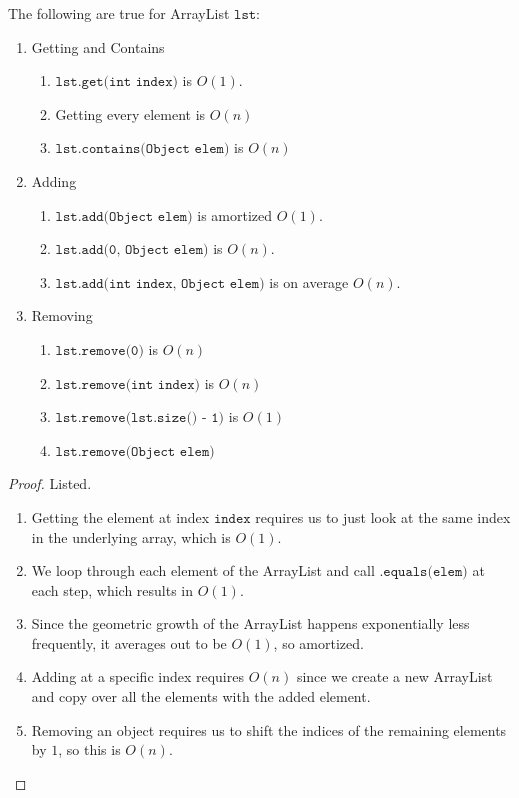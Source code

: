 \documentclass{article}
\begin{document}
    \begin{theorem}
    The following are true for ArrayList $\texttt{lst}$:  
    \begin{enumerate}
        \item Getting and Contains 
        \begin{enumerate}
            \item $\texttt{lst.get(int index)}$ is $O(1)$. 
            \item Getting every element is $O(n)$ 
            \item $\texttt{lst.contains(Object elem)}$ is $O(n)$
        \end{enumerate}
        
        \item Adding 
        \begin{enumerate}
            \item $\texttt{lst.add(Object elem)}$ is amortized $O(1)$. 
            \item $\texttt{lst.add(0, Object elem)}$ is $O(n)$. 
            \item $\texttt{lst.add(int index, Object elem)}$ is on average $O(n)$. 
        \end{enumerate}
        
        \item Removing 
        \begin{enumerate}
            \item $\texttt{lst.remove(0)}$ is $O(n)$ 
            \item $\texttt{lst.remove(int index)}$ is $O(n)$ 
            \item $\texttt{lst.remove(lst.size() - 1)}$ is $O(1)$ 
            \item $\texttt{lst.remove(Object elem)}$ 
        \end{enumerate}
    \end{enumerate}
    \end{theorem}
    \begin{proof}
    Listed. 
    \begin{enumerate}
        \item Getting the element at index $\texttt{index}$ requires us to just look at the same index in the underlying array, which is $O(1)$. 
        \item We loop through each element of the ArrayList and call $\texttt{.equals(elem)}$ at each step, which results in $O(1)$. 
        \item Since the geometric growth of the ArrayList happens exponentially less frequently, it averages out to be $O(1)$, so amortized. 
        \item Adding at a specific index requires $O(n)$ since we create a new ArrayList and copy over all the elements with the added element.  
        \item Removing an object requires us to shift the indices of the remaining elements by $1$, so this is $O(n)$. 
    \end{enumerate}
    \end{proof}
\end{document}
